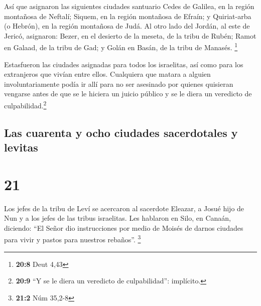  Así que asignaron las siguientes ciudades santuario Cedes
de Galilea, en la región montañosa de Neftalí; Siquem, en la región
montañosa de Efraín; y Quiriat-arba (o Hebrón), en la región montañosa
de Judá.  Al otro lado del Jordán, al este de Jericó,
asignaron: Bezer, en el desierto de la meseta, de la tribu de Rubén;
Ramot en Galaad, de la tribu de Gad; y Golán en Basán, de la tribu de
Manasés. \footnote{\textbf{20:8} Deut 4,43}

 Estasfueron las ciudades asignadas para todos los
israelitas, así como para los extranjeros que vivían entre ellos.
Cualquiera que matara a alguien involuntariamente podía ir allí para no
ser asesinado por quienes quisieran vengarse antes de que se le hiciera
un juicio público y se le diera un veredicto de culpabilidad.\footnote{\textbf{20:9}
  ``Y se le diera un veredicto de culpabilidad'': implícito.}

\hypertarget{las-cuarenta-y-ocho-ciudades-sacerdotales-y-levitas}{%
\subsection{Las cuarenta y ocho ciudades sacerdotales y
levitas}\label{las-cuarenta-y-ocho-ciudades-sacerdotales-y-levitas}}

\hypertarget{section-20}{%
\section{21}\label{section-20}}

 Los jefes de la tribu de Leví se acercaron al sacerdote
Eleazar, a Josué hijo de Nun y a los jefes de las tribus israelitas.
 Les hablaron en Silo, en Canaán, diciendo: ``El Señor dio
instrucciones por medio de Moisés de darnos ciudades para vivir y pastos
para nuestros rebaños''. \footnote{\textbf{21:2} Núm 35,2-8}

